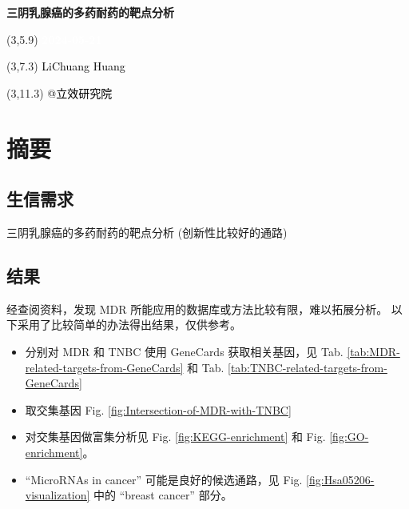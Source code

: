 \documentclass[
]{article}
\author{}
\date{\vspace{-2.5em}}
\providecommand{\tightlist}{%
  \setlength{\itemsep}{0pt}\setlength{\parskip}{0pt}}
\begin{document}
\begin{titlepage} 
\begin{center} \textbf{\Huge
三阴乳腺癌的多药耐药的靶点分析} \vspace{4em}
\begin{textblock}{10}(3,5.9) \huge
\textbf{\textcolor{white}{2024-05-21}}
\end{textblock} \begin{textblock}{10}(3,7.3)
\Large \textcolor{black}{LiChuang Huang}
\end{textblock} \begin{textblock}{10}(3,11.3)
\Large \textcolor{black}{@立效研究院}
\end{textblock} \end{center} \end{titlepage}
\restoregeometry


\tableofcontents

\listoffigures

\listoftables

\newpage


\hypertarget{abstract}{%
\section{摘要}\label{abstract}}

\hypertarget{ux751fux4fe1ux9700ux6c42}{%
\subsection{生信需求}\label{ux751fux4fe1ux9700ux6c42}}

三阴乳腺癌的多药耐药的靶点分析 (创新性比较好的通路)

\hypertarget{ux7ed3ux679c}{%
\subsection{结果}\label{ux7ed3ux679c}}

经查阅资料，发现 MDR 所能应用的数据库或方法比较有限，难以拓展分析。
以下采用了比较简单的办法得出结果，仅供参考。

\begin{itemize}
\tightlist
\item
  分别对 MDR 和 TNBC 使用 GeneCards 获取相关基因，见
  Tab. \ref{tab:MDR-related-targets-from-GeneCards} 和
  Tab. \ref{tab:TNBC-related-targets-from-GeneCards}
\item
  取交集基因 Fig. \ref{fig:Intersection-of-MDR-with-TNBC}
\item
  对交集基因做富集分析见 Fig. \ref{fig:KEGG-enrichment} 和 Fig. \ref{fig:GO-enrichment}。
\item
  ``MicroRNAs in cancer'' 可能是良好的候选通路，见 Fig. \ref{fig:Hsa05206-visualization} 中的 ``breast cancer'' 部分。
\end{itemize}
\end{document}

